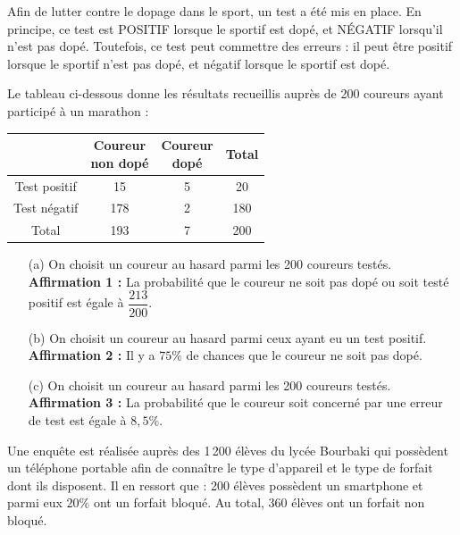 \documentclass[a4paper,11pt]{article}
\begin{document}
\begin{multicols}{2}
\begin{exercice}[title=Exercice 11 $\star\star$ { [Raisonner, Calculer] }]{}{}
  Afin de lutter contre le dopage dans le sport, un test a été mis en place. En principe, ce test est POSITIF lorsque le sportif est dopé, et NÉGATIF lorsqu'il n'est pas dopé. Toutefois, ce test peut commettre des erreurs : il peut être positif lorsque le sportif n'est pas dopé, et négatif lorsque le sportif est dopé.
  
  Le tableau ci-dessous donne les résultats recueillis auprès de 200 coureurs ayant participé à un marathon :
  
  \begin{center}
  \small
  \renewcommand{\arraystretch}{1.2}
  \begin{tabular}{|c|c|c|c|}
  \hline
   & \makecell{Coureur \\non dopé} & \makecell{Coureur \\dopé} & Total \\ \hline
  Test positif & 15 & 5 & 20 \\ \hline
  Test négatif & 178 & 2 & 180 \\ \hline
  Total & 193 & 7 & 200 \\ \hline
  \end{tabular}
  \end{center}
  
  \begin{enumerate}
    \item[(a)] On choisit un coureur au hasard parmi les 200 coureurs testés. \\
    \textbf{Affirmation 1 :} La probabilité que le coureur ne soit pas dopé ou soit testé positif est égale à $\dfrac{213}{200}$.
    
    \item[(b)] On choisit un coureur au hasard parmi ceux ayant eu un test positif. \\
    \textbf{Affirmation 2 :} Il y a $75\%$ de chances que le coureur ne soit pas dopé.
    
    \item[(c)] On choisit un coureur au hasard parmi les 200 coureurs testés. \\
    \textbf{Affirmation 3 :} La probabilité que le coureur soit concerné par une erreur de test est égale à $8{,}5\%$.
  \end{enumerate}
\end{exercice}

\newcolumn

\begin{exercice}[title=Exercice 12 $\star\star$ { [Modéliser, Calculer] }]{}{}
  Une enquête est réalisée auprès des 1\,200 élèves du lycée Bourbaki qui possèdent un téléphone portable afin de connaître le type d'appareil et le type de forfait dont ils disposent.
  Il en ressort que : 200 élèves possèdent un smartphone et parmi eux $20\%$ ont un forfait bloqué. Au total, 360 élèves ont un forfait non bloqué.


\end{exercice}
\end{multicols}
\end{document}
